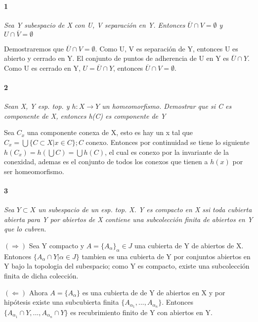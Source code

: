 \documentclass[12pt]{article}
\author{Alumnos: \\Arturo Rodriguez Contreras - 2132880 \\
Jonathan Raymundo Torres Cardenas - 1949731\\
Praxedis Jimenes Ruvalcaba \\
Erick Román Montemayor Treviño - 1957959 \\
Alexis Noe Mora Leyva \\
Everardo Flores Rivera - 2127301}
\begin{document}
\maketitle

\paragraph{1}
\textit{Sea Y subespacio de X con U, V separación en Y. Entonces $\overline{U}\cap V=\emptyset$ y $U\cap\overline{V}=\emptyset$}

Demostraremos que $\overline{U}\cap V=\emptyset$. Como U, V es separación de Y, entonces U es abierto y cerrado en Y. El conjunto de puntos de adherencia de U en Y es $\overline U \cap Y$. Como U es cerrado en Y, $U=\overline U \cap Y$, entonces $\overline U \cap V=\emptyset$.

\paragraph{2}
\textit{Sean X, Y esp. top. y $h:X\rightarrow Y$ un homeomorfismo. Demostrar que si C es componente de X, entonces h(C) es componente de Y}

Sea $C_x$ una componente conexa de X, esto es hay un x tal que $C_x=\bigcup\{C\subset X|x\in C\};C$ conexo. Entonces  por continuidad se tiene lo siguiente $h(C_x)=h(\bigcup C)=\bigcup h(C)$, el cual es conexo por la invariante de la conexidad, ademas es el conjunto de todos los conexos que tienen a $h(x)$ por ser homeomorfismo.
\paragraph{3}
\textit{Sea $Y\subset X$ un subespacio de un esp. top. X. Y es compacto en X ssi toda cubierta abierta para Y por abiertos de X contiene una subcolección finita de abiertos en Y que lo cubren.}

$(\Rightarrow)$ Sea Y compacto y $A=\{A_\alpha\}_\alpha\in J$ una cubierta de Y de abiertos de X. Entonces $\{A_\alpha\cap Y|\alpha\in J\}$ tambien es una cubierta de Y por conjuntos abiertos en Y bajo la topologia del subespacio; como Y es compacto, existe una subcolección finita de dicha colección.

$(\Leftarrow)$ Ahora $A=\{A_\alpha\}$ es una cubierta de de Y de abiertos en X y por hipótesis existe una subcubierta finita $\{A_{\alpha_1},...,A_{\alpha_n}\}$. Entonces $\{A_{\alpha_1}\cap Y,...,A_{\alpha_n}\cap Y\}$ es recubrimiento finito de Y con abiertos en Y.
\end{document}
